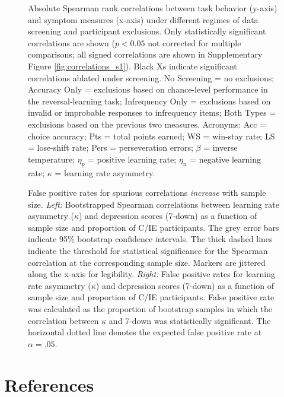 \documentclass[a4paper,notitlepage,12pt]{article}
\begin{document}
\begin{refsection}[main]
\clearpage
\begin{figure}[h]
    \centering
    \captionsetup{width=0.88\textwidth}
    \caption{Absolute Spearman rank correlations between task behavior (y-axis) and symptom measures (x-axis) under different regimes of data screening and participant exclusions. Only statistically significant correlations are shown ($p<0.05$ not corrected for multiple comparisons; all signed correlations are shown in Supplementary Figure \ref{fig:correlations_s1}). Black Xs indicate significant correlations ablated under screening. No Screening = no exclusions; Accuracy Only = exclusions based on chance-level performance in the reversal-learning task; Infrequency Only = exclusions based on invalid or improbable responses to infrequency items; Both Types = exclusions based on the previous two measures. Acronyms: Acc = choice accuracy; Pts = total points earned; WS = win-stay rate; LS = lose-shift rate; Pers = perseveration errors; $\beta$ = inverse temperature; $\eta_p$ = positive learning rate; $\eta_n$ = negative learning rate; $\kappa$ = learning rate asymmetry.}
    \label{fig:correlations}
\end{figure}

\clearpage
\begin{figure}[h]
    \centering
    \captionsetup{width=0.88\textwidth}
    \caption{False positive rates for spurious correlations \emph{increase} with sample size. \textit{Left:} Bootstrapped Spearman correlations between learning rate asymmetry ($\kappa$) and depression scores (7-down) as a function of sample size and proportion of C/IE participants. The grey error bars indicate 95\% bootstrap confidence intervals. The thick dashed lines indicate the threshold for statistical significance for the Spearman correlation at the corresponding sample size. Markers are jittered along the x-axis for legibility. \textit{Right:} False positive rates for learning rate asymmetry ($\kappa$) and depression scores (7-down) as a function of sample size and proportion of C/IE participants. False positive rate was calculated as the proportion of bootstrap samples in which the correlation between $\kappa$ and 7-down was statistically significant. The horizontal dotted line denotes the expected false positive rate at $\alpha = .05$.}
    \label{fig:bootstrap}
\end{figure}

\clearpage
\section*{References}

\printbibliography[heading=main]
\end{refsection}
\end{document}
